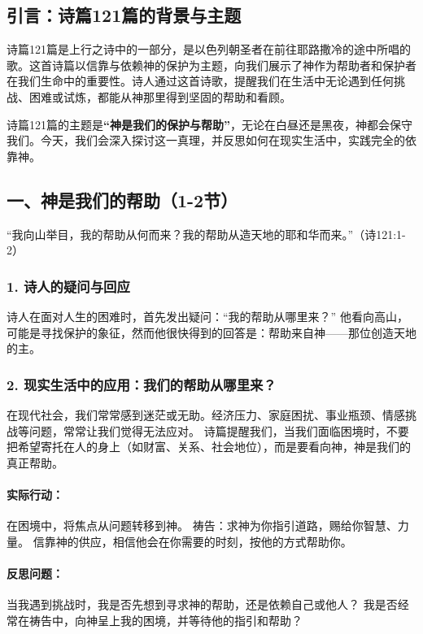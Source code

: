 \documentclass[a4paper, 12pt]{article}
\begin{document}

\subsection*{引言：诗篇121篇的背景与主题}
\hspace{0.6cm}诗篇121篇是上行之诗中的一部分，是以色列朝圣者在前往耶路撒冷的途中所唱的歌。这首诗篇以信靠与依赖神的保护为主题，向我们展示了神作为帮助者和保护者在我们生命中的重要性。诗人通过这首诗歌，提醒我们在生活中无论遇到任何挑战、困难或试炼，都能从神那里得到坚固的帮助和看顾。

诗篇121篇的主题是\textbf{“神是我们的保护与帮助”}，无论在白昼还是黑夜，神都会保守我们。今天，我们会深入探讨这一真理，并反思如何在现实生活中，实践完全的依靠神。

\subsection*{一、神是我们的帮助（1-2节）}
“我向山举目，我的帮助从何而来？我的帮助从造天地的耶和华而来。”（诗121:1-2）

\subsubsection*{1. 诗人的疑问与回应}
诗人在面对人生的困难时，首先发出疑问：“我的帮助从哪里来？”
他看向高山，可能是寻找保护的象征，然而他很快得到的回答是：帮助来自神——那位创造天地的主。
\subsubsection*{2. 现实生活中的应用：我们的帮助从哪里来？}
在现代社会，我们常常感到迷茫或无助。经济压力、家庭困扰、事业瓶颈、情感挑战等问题，常常让我们觉得无法应对。
诗篇提醒我们，当我们面临困境时，不要把希望寄托在人的身上（如财富、关系、社会地位），而是要看向神，神是我们的真正帮助。
\paragraph*{实际行动：}

在困境中，将焦点从问题转移到神。
祷告：求神为你指引道路，赐给你智慧、力量。
信靠神的供应，相信他会在你需要的时刻，按他的方式帮助你。
\paragraph*{反思问题：}

当我遇到挑战时，我是否先想到寻求神的帮助，还是依赖自己或他人？
我是否经常在祷告中，向神呈上我的困境，并等待他的指引和帮助？
\end{document}
